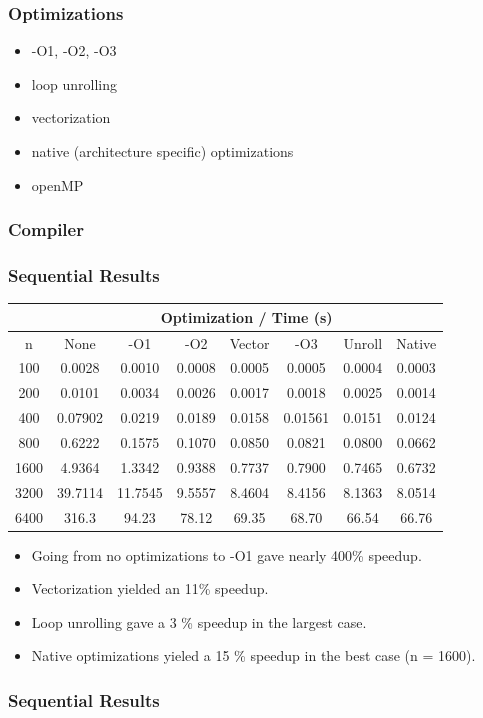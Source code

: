 \documentclass{beamer}
\begin{document}
\begin{frame}
\frametitle{Optimizations}

\begin{itemize}
\item -O1, -O2, -O3
\item loop unrolling
\item vectorization
\item native (architecture specific) optimizations
\item openMP
\end{itemize}

\end{frame}

\begin{frame}
\frametitle{Compiler}



\end{frame}

\begin{frame}[fragile]
\frametitle{Sequential Results}

\begin{tabular}{|c|c|c|c|c|c|c|c|}
\hline
& \multicolumn{7}{|c|}{Optimization / Time (s)} \\
\hline
n & None & -O1 & -O2 & Vector & -O3 & Unroll & Native\\
\hline
100	& 0.0028 & 0.0010 & 0.0008 & 0.0005 & 0.0005 & 0.0004 & 0.0003 \\
200	& 0.0101 & 0.0034 &	0.0026 & 0.0017 & 0.0018 & 0.0025 & 0.0014 \\
400	& 0.07902 & 0.0219 & 0.0189 & 0.0158 & 0.01561 & 0.0151 & 0.0124 \\
800	& 0.6222 & 0.1575 & 0.1070 & 0.0850 & 0.0821 & 0.0800 & 0.0662 \\
1600 & 4.9364 & 1.3342 & 0.9388 & 0.7737 & 0.7900 & 0.7465 & 0.6732 \\
3200&39.7114 & 11.7545 & 9.5557 & 8.4604 &	8.4156 & 8.1363 & 8.0514 \\
6400 & 316.3 & 94.23 & 78.12 &	69.35 & 68.70 & 66.54 & 66.76\\
\hline
\end{tabular}

\begin{itemize}
\setlength\itemsep{0.25em}
\item Going from no optimizations to -O1 gave nearly 400\% speedup.  
\item Vectorization yielded an 11\% speedup.
\item Loop unrolling gave a 3 \% speedup in the largest case.
\item Native optimizations yieled a 15 \% speedup in the best case (n = 1600).  
\end{itemize}

\end{frame}

\begin{frame}
\frametitle{Sequential Results}




\end{frame}
\end{document}
